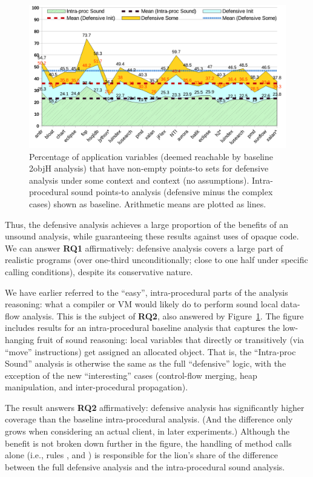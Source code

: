 \begin{figure}[tbh]
\centering
\includegraphics[width=\linewidth]{assets/defensive/vars.pdf}
\caption{Percentage of application variables (deemed reachable by baseline 2objH analysis) that have non-empty points-to sets for defensive analysis under some context and \ctxInit{} context (no assumptions). Intra-procedural sound points-to analysis (defensive minus the complex cases) shown as baseline. Arithmetic means are plotted as lines.}
\label{fig:sound:coverage}
\end{figure}

Thus, the defensive analysis achieves a large proportion of the benefits of an unsound analysis, while guaranteeing these results against uses of opaque code. We can answer \textbf{RQ1} affirmatively: defensive analysis covers a large part of realistic programs (over one-third unconditionally; close to one half under specific calling conditions), despite its conservative nature.


We have earlier referred to the ``easy'', intra-procedural parts of the analysis reasoning: what a compiler or VM would likely do to perform sound local data-flow analysis. This is the subject of \textbf{RQ2}, also answered by Figure~\ref{fig:sound:coverage}. The figure includes results for an intra-procedural baseline analysis that captures the low-hanging fruit of sound reasoning: local variables that directly or transitively (via ``move'' instructions) get assigned an allocated object. That is, the ``Intra-proc Sound'' analysis is otherwise the same as the full ``defensive'' logic, with the exception of the new ``interesting'' cases (control-flow merging, heap manipulation, and inter-procedural propagation). 

The result answers \textbf{RQ2} affirmatively: defensive analysis has significantly higher coverage than the baseline intra-procedural analysis. (And the difference only grows when considering an actual client, in later experiments.) Although the benefit is not broken down further in the figure, the handling of method calls alone (i.e., rules ,  and ) is responsible for the lion's share of the difference between the full defensive analysis and the intra-procedural sound analysis.


